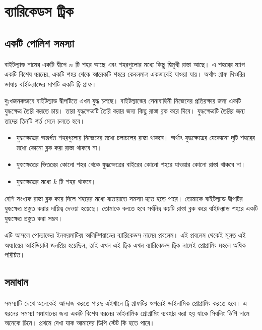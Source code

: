 \chapter{ব্যারিকেডস ট্রিক}

\section{একটি পোলিশ সমস্যা}
বাইটল্যান্ড নামের একটি দ্বীপে \(n\) টি শহর আছে এবং শহরগুলোর মধ্যে কিছু দ্বিমুখী রাস্তা আছে। এ শহরের ম্যাপ একটি বিশেষ ধরনের, একটি শহর থেকে আরেকটি শহরে কেবলমাত্র একভাবেই যাওয়া যায়। অর্থাৎ গ্রাফ থিওরির ভাষায় বাইটল্যান্ডের মাপটি একটি ট্রি গ্রাফ। 

দুঃখজনকভাবে বাইটল্যান্ড দ্বীপটিতে এখন যুদ্ধ চলছে। বাইটল্যান্ডের সেনাবাহিনী  নিজেদের প্রতিরক্ষার জন্য একটি যুদ্ধক্ষেত্র তৈরি করতে চায়। তারা যুদ্ধক্ষেত্রটি তৈরি করার জন্য কিছু রাস্তা ব্লক করে দিবে। যুদ্ধক্ষেত্রটি তৈরির জন্য তাদের তিনটি শর্ত মেনে চলতে হবে।

\renewcommand{\labelitemi}{$\rightarrow$}
\begin{itemize}
 \item যুদ্ধক্ষেত্রের অন্তর্গত শহরগুলোর নিজেদের মধ্যে চলাচলের রাস্তা থাকবে। অর্থাৎ যুদ্ধক্ষেত্রের যেকোনো দুটি শহরের মধ্যে কোনো ব্লক করা রাস্তা থাকবে না। 
 \item যুদ্ধক্ষেত্রের ভিতরের কোনো শহর থেকে যুদ্ধক্ষেত্রের বাইরের কোনো শহরে যাওয়ার কোনো রাস্তা থাকবে না। 
 \item যুদ্ধক্ষেত্রের মধ্যে \(k\) টি শহর থাকবে। 
\end{itemize}

বেশি সংখ্যক রাস্তা ব্লক করে দিলে শহরের মধ্যে যাতায়াতে সমস্যা হতে হতে পারে। তোমাকে বাইটল্যান্ড দ্বীপটির যুদ্ধক্ষেত্র প্রস্তুত করার দায়িত্ব দেওয়া হয়েছে। তোমাকে বলতে হবে সর্বনিম্ন কয়টি রাস্তা ব্লক করে বাইটল্যান্ড শহরে একটি যুদ্ধক্ষেত্র প্রস্তুত করা সম্ভব। 

এটি আসলে পোল্যান্ডের ইনফরমাটিক্স অলিম্পিয়াডের ব্যারিকেডস নামের প্রবলেম। এই প্রবলেম থেকেই মূলত এই অধ্যায়ের আইডিয়াটা জনপ্রিয় হয়েছিল, তাই এখন এই ট্রিক এখন ব্যারিকেডস ট্রিক নামেই প্রোগ্রামিং মহলে অধিক পরিচিত। 

\section{সমাধান}
সমস্যাটি দেখে অনেকেই আন্দাজ করতে পারছ এইখানে ট্রি গ্রাফটির ওপরেই ডাইনামিক প্রোগ্রামিং করতে হবে। এ ধরনের সমস্যা সমাধানের জন্য একটি বিশেষ ধরনের ডাইনামিক প্রোগ্রামিং ব্যবহার করা হয় যাকে সিবলিং ডিপি নামে অনেকে চিনে। প্রথমে দেখা যাক আমাদের ডিপি স্টেট কি হতে পারে।

